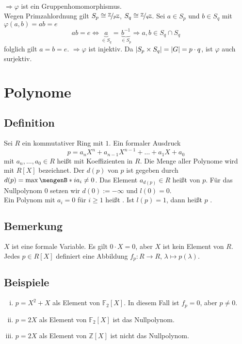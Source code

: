 $\Rightarrow \varphi$ ist ein Gruppenhomomorphismus.\\
Wegen Primzahlordnung gilt $S_p \cong \nicefrac{\mathds{Z}}{p \mathds{Z}}$, $S_q \cong \nicefrac{\mathds{Z}}{q \mathds{Z}}$. Sei $a \in S_p$ und $b \in S_q$ mit $\varphi(a,b)=ab =e$
\[
	a b = e \Leftrightarrow \underbrace{a}_{\in S_q} = \underbrace{b ^{-1} }_{\in S_p} \Rightarrow  a,b \in S_q \cap S_q
\]
folglich gilt $a=b=e$. $\Rightarrow \varphi$ ist injektiv. Da $\abs*{S_p \times S_q} = \abs*{G}= p \cdot q  $, ist $\varphi$ auch surjektiv. \bewende
\newpage
\section{Polynome} %
\label{sec:5}

\subsection[Definition: Polynom, Grad, Leitkoeffizient]{Definition} %
\label{sub:51}
Sei $R$ ein kommutativer Ring mit $1$. Ein formaler Ausdruck
\[
	p = a_n X^n + a_{n-1} X^{n-1} + \ldots + a_1 X + a_0
\]
mit $a_n, \ldots , a_0 \in R$ heißt  mit Koeffizienten in $R$. Die Menge aller Polynome wird mit $R[X]$ bezeichnet. Der  $d(p)$
von $p$ ist gegeben durch $d(p) = \max \set[i]{a_i \not=0}$. Das Element $a_{d(p)} \in R$ heißt  von $p$. Für das Nullpolynom $0$ setzen wir
$d(0) := - \infty$ und $l(0)=0$. \\
Ein Polynom mit $a_i = 0$ für $i \ge 1$ heißt . Ist $l(p)=1$, dann heißt $p$ . 

\subsection[Bemerkung: $X$ ist nur formale Variable!]{Bemerkung} %
\label{sub:52}
$X$ ist eine formale Variable. Es gilt $0 \cdot X = 0$, aber $X$ ist kein Element von $R$. Jedes $p \in R[X]$ definiert eine Abbildung $f_p : R \to R$, 
$\lambda  \mapsto p(\lambda )$.

\subsection[Beispiele zum Unterschied zwischen einen Polynom und zugehöriger Abbildung]{Beispiele} %
\label{sub:53}
\begin{enumerate}[(i)]
	\item $p= X^2+X$ als Element von $\mathds{F}_2[X]$. In diesem Fall ist $f_p =0$, aber $p \not= 0$.
	\item $p=2X$ als Element von $\mathds{F}_2[X]$ ist das Nullpolynom.
	\item $p=2X$ als Element von $\mathds{Z}[X]$ ist nicht das Nullpolynom.
\end{enumerate}

